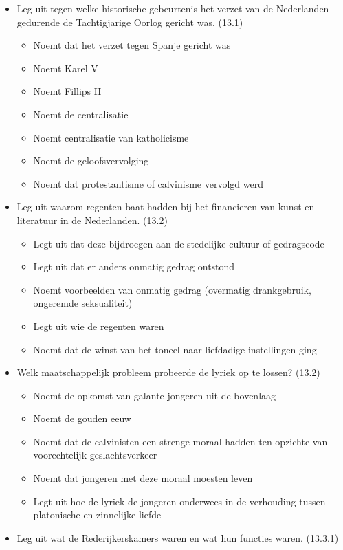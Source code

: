 \begin{itemize}
\itemsep1pt\parskip0pt
\item
  Leg uit tegen welke historische gebeurtenis het verzet van de
  Nederlanden gedurende de Tachtigjarige Oorlog gericht was. (13.1)

  \begin{itemize}
  \itemsep1pt\parskip0pt
  \item
    Noemt dat het verzet tegen Spanje gericht was
  \item
    Noemt Karel V
  \item
    Noemt Fillips II
  \item
    Noemt de centralisatie
  \item
    Noemt centralisatie van katholicisme
  \item
    Noemt de geloofsvervolging
  \item
    Noemt dat protestantisme of calvinisme vervolgd werd
  \end{itemize}
\item
  Leg uit waarom regenten baat hadden bij het financieren van kunst en
  literatuur in de Nederlanden. (13.2)

  \begin{itemize}
  \itemsep1pt\parskip0pt
  \item
    Legt uit dat deze bijdroegen aan de stedelijke cultuur of
    gedragscode
  \item
    Legt uit dat er anders onmatig gedrag ontstond
  \item
    Noemt voorbeelden van onmatig gedrag (overmatig drankgebruik,
    ongeremde seksualiteit)
  \item
    Legt uit wie de regenten waren
  \item
    Noemt dat de winst van het toneel naar liefdadige instellingen ging
  \end{itemize}
\item
  Welk maatschappelijk probleem probeerde de lyriek op te lossen? (13.2)

  \begin{itemize}
  \itemsep1pt\parskip0pt
  \item
    Noemt de opkomst van galante jongeren uit de bovenlaag
  \item
    Noemt de gouden eeuw
  \item
    Noemt dat de calvinisten een strenge moraal hadden ten opzichte van
    voorechtelijk geslachtsverkeer
  \item
    Noemt dat jongeren met deze moraal moesten leven
  \item
    Legt uit hoe de lyriek de jongeren onderwees in de verhouding tussen
    platonische en zinnelijke liefde
  \end{itemize}
\item
  Leg uit wat de Rederijkerskamers waren en wat hun functies waren.
  (13.3.1)


\end{itemize}
